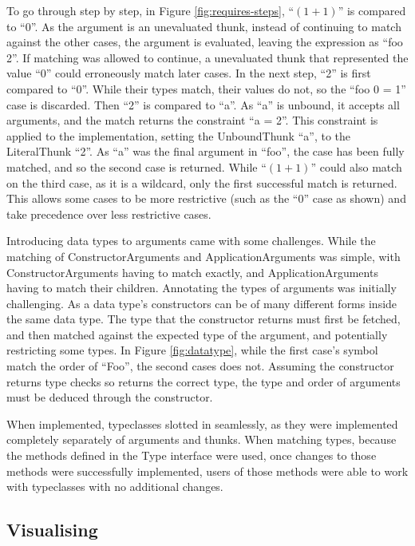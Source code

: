 To go through step by step, in Figure \ref{fig:requires-steps}, ``$(1+1)$'' is compared to ``0''. As the argument is an unevaluated thunk, instead of continuing to match against the other cases, the argument is evaluated, leaving the expression as ``foo 2''. If matching was allowed to continue, a unevaluated thunk that represented the value ``0'' could erroneously match later cases. In the next step, ``2'' is first compared to ``0''. While their types match, their values do not, so the ``foo 0 = 1'' case is discarded. Then ``2'' is compared to ``a''. As ``a'' is unbound, it accepts all arguments, and the match returns the constraint ``a = 2''. This constraint is applied to the implementation, setting the UnboundThunk ``a'', to the LiteralThunk ``2''. As ``a'' was the final argument in ``foo'', the case has been fully matched, and so the second case is returned.
While ``$(1+1)$'' could also match on the third case, as it is a wildcard, only the first successful match is returned. This allows some cases to be more restrictive (such as the ``0'' case as shown) and take precedence over less restrictive cases.

Introducing data types to arguments came with some challenges.
While the matching of ConstructorArguments and ApplicationArguments was simple, with ConstructorArguments having to match exactly, and ApplicationArguments having to match their children. Annotating the types of arguments was initially challenging.
As a data type's constructors can be of many different forms inside the same data type. The type that the constructor returns must first be fetched, and then matched against the expected type of the argument, and potentially restricting some types. In Figure \ref{fig:datatype}, while the first case's symbol match the order of ``Foo'', the second cases does not. Assuming the constructor returns type checks so returns the correct type, the type and order of arguments must be deduced through the constructor.


When implemented, typeclasses slotted in seamlessly, as they were implemented completely separately of arguments and thunks. When matching types, because the methods defined in the Type interface were used, once changes to those methods were successfully implemented, users of those methods were able to work with typeclasses with no additional changes.

\subsection{Visualising}
